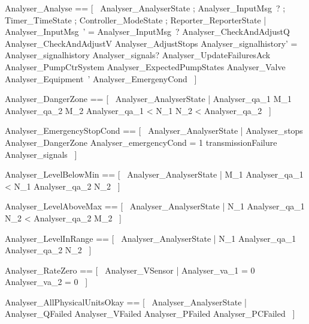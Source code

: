 \documentclass{article}
\begin{document}
\begin{zed}
	Analyser\_Analyse == [~  \Delta Analyser\_AnalyserState ; Analyser\_InputMsg~? ; \Xi Timer\_TimeState ; \Xi Controller\_ModeState ; \Xi Reporter\_ReporterState | \theta Analyser\_InputMsg~' = \theta Analyser\_InputMsg~? \land Analyser\_CheckAndAdjustQ \land Analyser\_CheckAndAdjustV \land Analyser\_AdjustStops \land Analyser\_signalhistory' = Analyser\_signalhistory \cup Analyser\_signals? \land Analyser\_UpdateFailuresAck \land \Xi Analyser\_PumpCtrSystem \land \Xi Analyser\_ExpectedPumpStates \land \Xi Analyser\_Valve \land Analyser\_Equipment~' \land \Xi Analyser\_EmergenyCond  ~]
\end{zed}

\begin{zed}
	Analyser\_DangerZone == [~  Analyser\_AnalyserState | Analyser\_qa\_1 \geq M\_1 \land Analyser\_qa\_2 \leq M\_2 \implies Analyser\_qa\_1 < N\_1 \land N\_2 < Analyser\_qa\_2  ~]
\end{zed}

\begin{zed}
	Analyser\_EmergencyStopCond == [~  Analyser\_AnalyserState | Analyser\_stops  \lor Analyser\_DangerZone \lor Analyser\_emergencyCond = 1 \lor transmissionFailure \in Analyser\_signals  ~]
\end{zed}

\begin{zed}
	Analyser\_LevelBelowMin == [~  Analyser\_AnalyserState | M\_1 \leq Analyser\_qa\_1 < N\_1 \land Analyser\_qa\_2 \leq N\_2  ~]
\end{zed}

\begin{zed}
	Analyser\_LevelAboveMax == [~  Analyser\_AnalyserState | N\_1 \leq Analyser\_qa\_1 \land N\_2 < Analyser\_qa\_2 \leq M\_2  ~]
\end{zed}

\begin{zed}
	Analyser\_LevelInRange == [~  Analyser\_AnalyserState | N\_1 \leq Analyser\_qa\_1 \land Analyser\_qa\_2 \leq N\_2  ~]
\end{zed}

\begin{zed}
	Analyser\_RateZero == [~  Analyser\_VSensor | Analyser\_va\_1 = 0 \land Analyser\_va\_2 = 0  ~]
\end{zed}

\begin{zed}
	Analyser\_AllPhysicalUnitsOkay == [~  Analyser\_AnalyserState | \lnot Analyser\_QFailed \land \lnot Analyser\_VFailed \land \lnot Analyser\_PFailed \land \lnot Analyser\_PCFailed  ~]
\end{zed}
\end{document}
